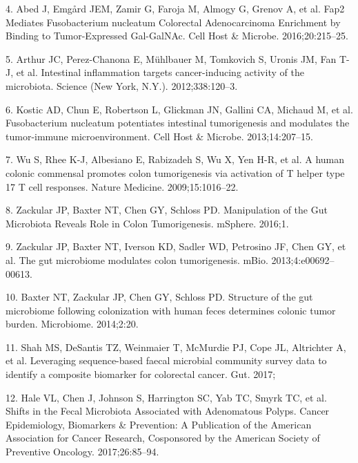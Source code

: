 \documentclass[12pt,]{article}
\begin{document}
\hypertarget{ref-abed_fap2_2016}{}
4. Abed J, Emgård JEM, Zamir G, Faroja M, Almogy G, Grenov A, et al.
Fap2 Mediates Fusobacterium nucleatum Colorectal Adenocarcinoma
Enrichment by Binding to Tumor-Expressed Gal-GalNAc. Cell Host \&
Microbe. 2016;20:215--25.

\hypertarget{ref-arthur_intestinal_2012}{}
5. Arthur JC, Perez-Chanona E, Mühlbauer M, Tomkovich S, Uronis JM, Fan
T-J, et al. Intestinal inflammation targets cancer-inducing activity of
the microbiota. Science (New York, N.Y.). 2012;338:120--3.

\hypertarget{ref-kostic_fusobacterium_2013}{}
6. Kostic AD, Chun E, Robertson L, Glickman JN, Gallini CA, Michaud M,
et al. Fusobacterium nucleatum potentiates intestinal tumorigenesis and
modulates the tumor-immune microenvironment. Cell Host \& Microbe.
2013;14:207--15.

\hypertarget{ref-wu_human_2009}{}
7. Wu S, Rhee K-J, Albesiano E, Rabizadeh S, Wu X, Yen H-R, et al. A
human colonic commensal promotes colon tumorigenesis via activation of T
helper type 17 T cell responses. Nature Medicine. 2009;15:1016--22.

\hypertarget{ref-zackular_manipulation_2016}{}
8. Zackular JP, Baxter NT, Chen GY, Schloss PD. Manipulation of the Gut
Microbiota Reveals Role in Colon Tumorigenesis. mSphere. 2016;1.

\hypertarget{ref-zackular_gut_2013}{}
9. Zackular JP, Baxter NT, Iverson KD, Sadler WD, Petrosino JF, Chen GY,
et al. The gut microbiome modulates colon tumorigenesis. mBio.
2013;4:e00692--00613.

\hypertarget{ref-baxter_structure_2014}{}
10. Baxter NT, Zackular JP, Chen GY, Schloss PD. Structure of the gut
microbiome following colonization with human feces determines colonic
tumor burden. Microbiome. 2014;2:20.

\hypertarget{ref-shah_leveraging_2017}{}
11. Shah MS, DeSantis TZ, Weinmaier T, McMurdie PJ, Cope JL, Altrichter
A, et al. Leveraging sequence-based faecal microbial community survey
data to identify a composite biomarker for colorectal cancer. Gut. 2017;

\hypertarget{ref-hale_shifts_2017}{}
12. Hale VL, Chen J, Johnson S, Harrington SC, Yab TC, Smyrk TC, et al.
Shifts in the Fecal Microbiota Associated with Adenomatous Polyps.
Cancer Epidemiology, Biomarkers \& Prevention: A Publication of the
American Association for Cancer Research, Cosponsored by the American
Society of Preventive Oncology. 2017;26:85--94.
\end{document}
